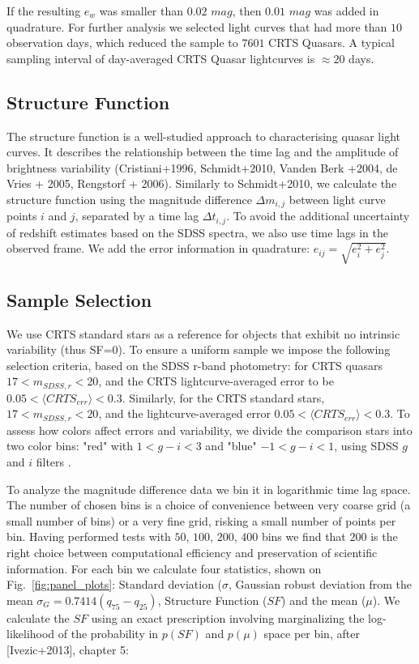 \documentclass[a4paper,fleqn,usenatbib]{mnras}
\begin{document}
If the resulting $e_{w}$ was smaller than $0.02$ $mag$, then  $0.01$ $mag$ was added in quadrature. For further analysis we selected light curves that had more than $10$ observation days, which reduced the sample to $7601$ CRTS Quasars. A typical sampling interval of day-averaged CRTS Quasar lightcurves is $\approx 20$ days. 

\subsection{Structure Function}

The structure function is a well-studied approach to characterising quasar light curves. It describes the relationship between the time lag and the amplitude of brightness variability (Cristiani+1996, Schmidt+2010, Vanden Berk +2004, de Vries + 2005, Rengstorf + 2006). Similarly to Schmidt+2010, we  calculate the structure function using  the magnitude difference $\Delta m _{i,j}$ between light curve points $i$ and $j$, separated by a time lag $\Delta t_{i,j}$. To avoid the additional uncertainty of redshift estimates based on the SDSS spectra, we also use time lags in the observed frame. We add the error information in quadrature: $e_{ij} = \sqrt{e_{i}^{2}+e_{j}^{2}}$. 



\subsection{Sample Selection}

We use CRTS standard stars as a reference for objects that exhibit no intrinsic variability (thus SF=0).  To ensure a uniform sample we impose the following selection criteria, based on the SDSS r-band photometry: for CRTS quasars  $17< m_{SDSS,r} < 20$, and the CRTS lightcurve-averaged error to be  $0.05 < \langle CRTS_{err} \rangle < 0.3$. Similarly, for the CRTS standard stars, $17 < m_{SDSS,r} < 20 $, and the lightcurve-averaged error $0.05 < \langle CRTS_{err} \rangle < 0.3$. To assess how colors affect errors and variability,  we divide the comparison stars into two color bins: "red" with   $1 < g-i < 3$ and "blue" $-1 < g-i < 1$,  using SDSS $g$ and $i$ filters . 

To analyze the magnitude difference data we bin it in logarithmic time lag space. The number of chosen bins is a choice of convenience between very coarse grid (a small number of bins) or a very fine grid, risking a small number of points per bin. Having performed tests  with $50$, $100$, $200$, $400$ bins we find that $200$ is the right choice between computational efficiency and preservation of scientific information. For each bin we calculate four statistics, shown on Fig.~\ref{fig:panel_plots}: Standard deviation ($\sigma$, Gaussian robust deviation from the mean $\sigma_{G}=0.7414 (q_{75}-q_{25})$, Structure Function ($SF$) and the mean ($\mu$).  We calculate the $SF$ using an exact prescription involving marginalizing the log-likelihood of the probability in $p(SF)$ and $p(\mu)$ space per bin, after [Ivezic+2013], chapter 5: 
 
\end{document}
